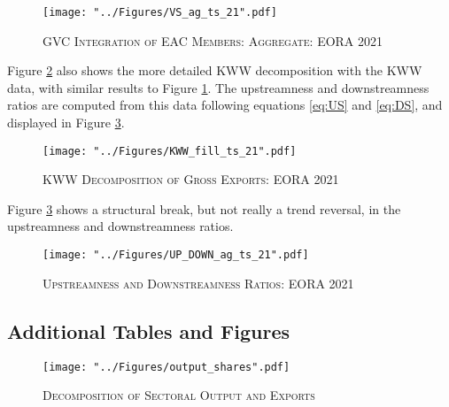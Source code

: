\documentclass[a4paper]{article}
\begin{document}
\begin{figure}[h!]
\centering
\caption{\label{fig:VSag_ts_21}\textsc{GVC Integration of EAC Members: Aggregate: EORA 2021}}
\texttt{[image: "../Figures/VS\_ag\_ts\_21".pdf]} %
\end{figure}
\FloatBarrier

Figure \ref{fig:KWW_fill_ts_21} also shows the more detailed KWW decomposition with the KWW data, with similar results to Figure \ref{fig:VSag_ts_21}. The upstreamness and downstreamness ratios are computed from this data following equations \ref{eq:US} and \ref{eq:DS}, and displayed in Figure \ref{fig:UP_DOWN_ag_ts_21}.


\begin{figure}[h!]
\centering
\caption{\label{fig:KWW_fill_ts_21}\textsc{KWW Decomposition of Gross Exports: EORA 2021}}
\texttt{[image: "../Figures/KWW\_fill\_ts\_21".pdf]} %
\end{figure}
\FloatBarrier

Figure \ref{fig:UP_DOWN_ag_ts_21} shows a structural break, but not really a trend reversal, in the upstreamness and downstreamness ratios. 

\begin{figure}[h!] %
\centering
\caption{\label{fig:UP_DOWN_ag_ts_21}\textsc{Upstreamness and Downstreamness Ratios: EORA 2021}}
\texttt{[image: "../Figures/UP\_DOWN\_ag\_ts\_21".pdf]} %
\end{figure} 
\FloatBarrier 


\subsection*{Additional Tables and Figures}

\begin{figure}[!h]
\centering
\vspace{-2cm}
\caption{\label{fig:outshares}\textsc{Decomposition of Sectoral Output and Exports}}
\vspace*{\fill}
\begin{adjustbox}{center}
\texttt{[image: "../Figures/output\_shares".pdf]} %
\end{adjustbox}
\vspace*{\fill}
\end{figure}
\FloatBarrier
\end{document}
